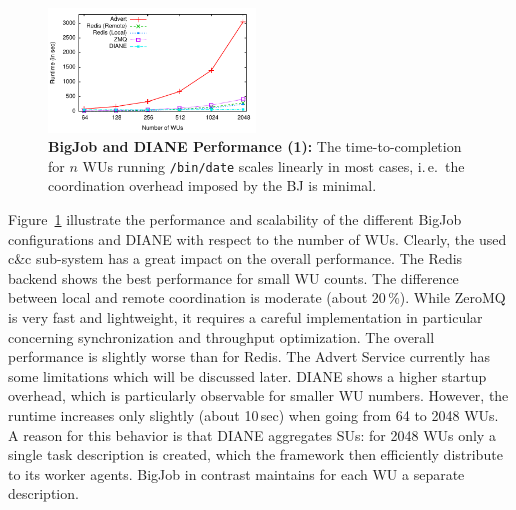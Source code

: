 \documentclass[conference,final]{IEEEtran}
\makeatletter
\def\reduwave{\bgroup \markoverwith{\lower3.5\p@\hbox{\sixly \textcolor{red}{\char58}}}\ULon}
\newcommand{\jwave}[1]{ {\reduwave{#1}}}
\newcommand{\jhanote}[1]{ {\textcolor{red} { ***shantenu: #1 }}}
\newcommand{\alnote}[1]{ {\textcolor{blue} { ***andre: #1 }}}
\newcommand{\jwave}[1]{#1}
\newcommand{\alnote}[1]{}
\newcommand{\jhanote}[1]{}
\makeatother
\begin{document}





\begin{figure}[htbp] \centering
\includegraphics[width=0.49\textwidth]{perf/bigjob-varying-wus-alamo.pdf}
\caption{\textbf{BigJob and DIANE Performance (1):} The 
time-to-completion for $n$ WUs running \texttt{/bin/date} scales linearly
in most cases, i.\,e.\ the coordination overhead imposed by the BJ is 
minimal. }
\label{fig:perf_bigjob-varying-wus} \end{figure}

Figure~\ref{fig:perf_bigjob-varying-wus} illustrate the performance and
scalability of the different BigJob configurations and DIANE with respect to the
number of WUs. Clearly, the used c\&c sub-system has a great impact on the
overall performance. The Redis backend shows the best performance for small WU
counts. The difference between local and remote coordination is moderate (about
20\,\%). While ZeroMQ is very fast and lightweight, it requires a careful
implementation in particular concerning synchronization and throughput
optimization. The overall performance is slightly worse than for Redis. The
Advert Service currently has some limitations which will be discussed later.
DIANE shows a higher startup overhead, which is particularly observable for
smaller WU numbers. However, the runtime increases only slightly (about 10\,sec)
when going from 64 to 2048 WUs. A reason for this behavior is that DIANE
aggregates SUs: for 2048 WUs only a single task description is created, which
the framework then efficiently distribute to its worker agents. BigJob in
contrast maintains for each WU a separate description. 
\end{document}
